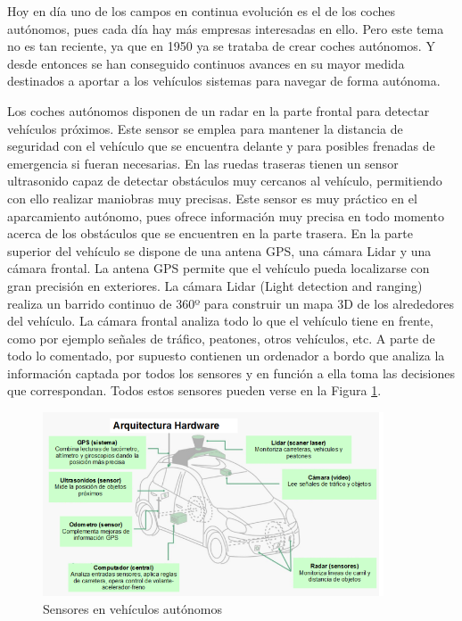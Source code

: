 Hoy en día uno de los campos en continua evolución es el de los coches autónomos, pues cada día hay más empresas interesadas en ello. Pero este tema no es tan reciente, ya que en 1950 ya se trataba de crear coches autónomos. Y desde entonces se han conseguido continuos avances en su mayor medida destinados a aportar a los vehículos sistemas para navegar de forma autónoma.

Los coches autónomos disponen de un radar en la parte frontal para detectar vehículos próximos. Este sensor se emplea para mantener la distancia de seguridad con el vehículo que se encuentra delante y para posibles frenadas de emergencia si fueran necesarias. En las ruedas traseras tienen un sensor ultrasonido capaz de detectar obstáculos muy cercanos al vehículo, permitiendo con ello realizar maniobras muy precisas. Este sensor es muy práctico en el aparcamiento autónomo, pues ofrece información muy precisa en todo momento acerca de los obstáculos que se encuentren en la parte trasera. En la parte superior del vehículo se dispone de una antena GPS, una cámara Lidar y una cámara frontal. La antena GPS permite que el vehículo pueda localizarse con gran precisión en exteriores. La cámara Lidar (Light detection and ranging) realiza un barrido continuo de 360º para construir un mapa 3D de los alrededores del vehículo. La cámara frontal analiza todo lo que el vehículo tiene en frente, como por ejemplo señales de tráfico, peatones, otros vehículos, etc. A parte de todo lo comentado, por supuesto contienen un ordenador a bordo que analiza la información captada por todos los sensores y en función a ella toma las decisiones que correspondan. Todos estos sensores pueden verse en la Figura \ref{fig.coche_autonomo}.

\begin{figure}[H]
  \begin{center}
    \includegraphics[width=0.9\textwidth]{figures/Introduccion/coche_autonomo.png}
		\caption{ Sensores en vehículos autónomos}
		\label{fig.coche_autonomo}
		\end{center}
\end{figure}

